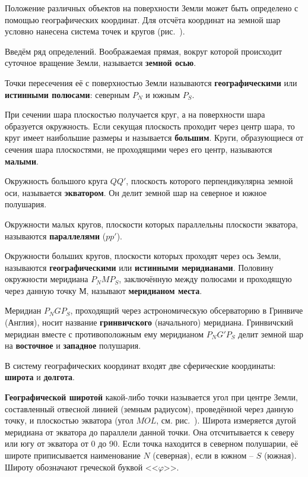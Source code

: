 Положение различных объектов на поверхности Земли может быть
определено с помощью географических координат. Для отсчёта координат
на земной шар условно нанесена система точек и кругов (рис.~).

Введём ряд определений. Воображаемая прямая, вокруг которой происходит
суточное вращение Земли, называется \textbf{земной осью}.

Точки пересечения её с поверхностью Земли называются
\textbf{географическими} или \textbf{истинными полюсами}: северным
$P_N$ и южным $P_S$.

При сечении шара плоскостью получается круг, а на поверхности шара
образуется окружность. Если секущая плоскость проходит через центр
шара, то круг имеет наибольшие размеры и называется
\textbf{большим}. Круги, образующиеся от сечения шара плоскостями, не
проходящими через его центр, называются \textbf{малыми}.

Окружность большого круга $QQ'$, плоскость которого перпендикулярна
земной оси, называется \textbf{экватором}. Он делит земной шар на
северное и южное полушария.

Окружности малых кругов, плоскости которых параллельны плоскости
экватора, называются \textbf{параллелями} ($pp'$).

Окружности больших кругов, плоскости которых проходят через ось Земли,
называются 
\textbf{географическими} или \textbf{истинными
  меридианами}. Половину окружности меридиана $P_NMP_S$, заключённую
между полюсами и проходящую через данную точку $М$, называют
\textbf{меридианом места}.

Меридиан $P_NGP_S$, проходящий через астрономическую обсерваторию в
Гринвиче (Англия), носит название \textbf{гринвичского} (начального)
меридиана. Гринвичский меридиан вместе с противоположным ему
меридианом $P_NG'P_S$ делит земной шар на \textbf{восточное} и
\textbf{западное} полушария.

В систему географических координат входят две сферические координаты:
 \textbf{широта} и \textbf{долгота}.

\textbf{Географической широтой}
какой-либо точки называется угол при центре Земли, составленный
отвесной линией (земным радиусом), проведённой через данную точку, и
плоскостью экватора (угол $MOL$, см. рис.~). Широта измеряется
дугой меридиана от экватора до параллели данной точки. Она
отсчитывается к северу или югу от экватора от 0 до 90\gr. Если точка
находится в северном полушарии, её широте приписывается наименование
$N$ (северная), если в южном \--- $S$ (южная). Широту обозначают
греческой буквой <<$\varphi$>>.

